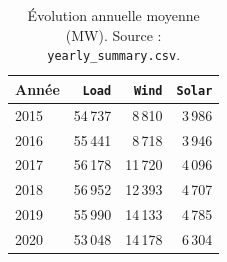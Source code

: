 \begin{table}[H]
\centering
\caption{Évolution annuelle moyenne (MW). Source : \texttt{yearly\_summary.csv}.}
\label{tab:yearly}
\small
\begin{tabular}{lrrr}
\toprule
Année & \texttt{Load} & \texttt{Wind} & \texttt{Solar} \\
\midrule
2015 & 54\,737 & 8\,810 & 3\,986 \\
2016 & 55\,441 & 8\,718 & 3\,946 \\
2017 & 56\,178 & 11\,720 & 4\,096 \\
2018 & 56\,952 & 12\,393 & 4\,707 \\
2019 & 55\,990 & 14\,133 & 4\,785 \\
2020 & 53\,048 & 14\,178 & 6\,304 \\
\bottomrule
\end{tabular}
\end{table}

